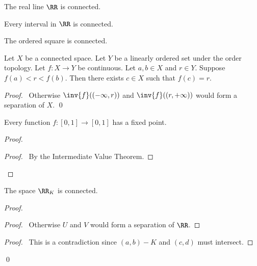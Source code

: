 \begin{corollary}
    The real line $\RR$ is connected.
\end{corollary}

\begin{corollary}
    \label{corollary:connected_interval}
    Every interval in $\RR$ is connected.
\end{corollary}

\begin{corollary}
    The ordered square is connected.
\end{corollary}

\begin{theorem}
    Let $X$ be a connected space. Let $Y$ be a linearly ordered set under the order topology. Let $f : X \rightarrow Y$ be continuous.
    Let $a, b \in X$ and $r \in Y$. Suppose $f(a) < r < f(b)$. Then there exists $c \in X$ such that $f(c) = r$.
\end{theorem}

\begin{proof}
    \pf\ Otherwise $\inv{f}((- \infty, r))$ and $\inv{f}((r, + \infty))$ would form a separation of $X$. \qed
\end{proof}

\begin{proposition}
    Every function $f : [0,1] \rightarrow [0,1]$ has a fixed point.
\end{proposition}

\begin{proof}
    \pf
    \begin{proof}
        \pf\ By the Intermediate Value Theorem.
    \end{proof}
\end{proof}

\begin{example}
    The space $\RR_K$ is connected.
\end{example}

\begin{proof}
    \pf
    \begin{proof}
        \pf\ Otherwise $U$ and $V$ would form a separation of $\RR$.
    \end{proof}
    \qedstep
    \begin{proof}
        \pf\ This is a contradiction since $(a,b) - K$ and $(c,d)$ must intersect.
    \end{proof}
    \qed
\end{proof}

